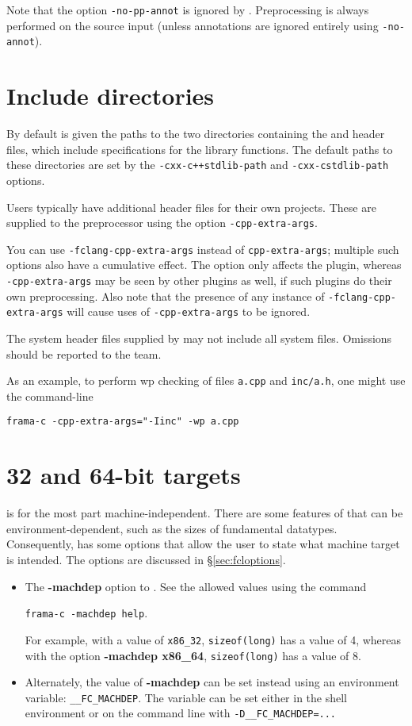 Note that the \framac option \verb|-no-pp-annot| is ignored by \fclang. Preprocessing is always performed on the source input (unless annotations are ignored entirely using \verb|-no-annot|).
\section{Include directories}

By default \irg is given the paths to the two directories containing the \fcl and \fc header files, which include \acslpp specifications for the \cpp library functions. The default paths to these directories are set by the \lstinline|-cxx-c++stdlib-path| and \lstinline|-cxx-cstdlib-path| options.

Users typically have additional header files for their own projects. These are supplied to the \fcl preprocessor using the option \lstinline|-cpp-extra-args|.

You can use \lstinline|-fclang-cpp-extra-args| instead of \lstinline|cpp-extra-args|; multiple such options also have a cumulative effect. 
The \fcl option only affects the \fcl plugin, whereas 
\lstinline|-cpp-extra-args| may be seen by other plugins as well, if such plugins do their own preprocessing. Also note that the presence of any instance of \lstinline|-fclang-cpp-extra-args| will cause uses of \lstinline|-cpp-extra-args| to be ignored. 

The system header files supplied by \fcl may not include all \cpp system files. Omissions should be reported to the \fc team.

As an example, to perform wp checking of files \lstinline|a.cpp| and \lstinline|inc/a.h|, one might use the command-line \\
\centerline{\lstinline|frama-c -cpp-extra-args="-Iinc" -wp a.cpp|}

\section{32 and 64-bit targets}
\label{sec:bit}

\acslpp is for the most part machine-independent. There are some features of \cpp that can be environment-dependent, such as the sizes of fundamental datatypes. Consequently, \framac has some options that allow the user to state what machine target is intended. The \fcl options are discussed in \S\ref{sec:fcloptions}.

\begin{itemize}
\item The \textbf{-machdep} option to \framac. See the allowed values using the command\\
\centerline{ \lstinline|frama-c -machdep help|.}
 For example, with a value of \lstinline|x86_32|, \lstinline|sizeof(long)| has a value of 4, whereas with the option \textbf{-machdep x86\_64}, \lstinline|sizeof(long)| has a value of 8.
\item Alternately, the value of \textbf{-machdep} can be set instead using an environment variable: \lstinline|__FC_MACHDEP|. The variable can be set either in the shell environment or on the command line with \lstinline|-D__FC_MACHDEP=...|

\end{itemize}


